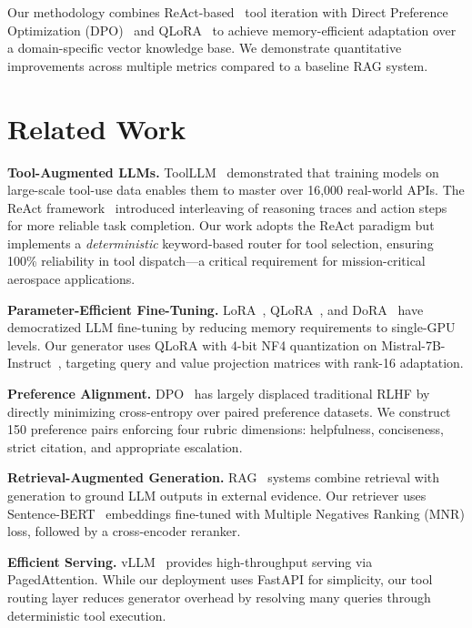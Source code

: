 \documentclass{article}
\begin{document}
Our methodology combines ReAct-based~\citep{yao2022react} tool iteration with Direct Preference Optimization (DPO)~\citep{rafailov2023direct} and QLoRA~\citep{dettmers2023qlora} to achieve memory-efficient adaptation over a domain-specific vector knowledge base. We demonstrate quantitative improvements across multiple metrics compared to a baseline RAG system.

\section{Related Work}

\textbf{Tool-Augmented LLMs.}
ToolLLM~\citep{qin2023toolllm} demonstrated that training models on large-scale tool-use data enables them to master over 16,000 real-world APIs. The ReAct framework~\citep{yao2022react} introduced interleaving of reasoning traces and action steps for more reliable task completion. Our work adopts the ReAct paradigm but implements a \textit{deterministic} keyword-based router for tool selection, ensuring 100\% reliability in tool dispatch---a critical requirement for mission-critical aerospace applications.

\textbf{Parameter-Efficient Fine-Tuning.}
LoRA~\citep{hu2021lora}, QLoRA~\citep{dettmers2023qlora}, and DoRA~\citep{liu2024dora} have democratized LLM fine-tuning by reducing memory requirements to single-GPU levels. Our generator uses QLoRA with 4-bit NF4 quantization on Mistral-7B-Instruct~\citep{jiang2023mistral}, targeting query and value projection matrices with rank-16 adaptation.

\textbf{Preference Alignment.}
DPO~\citep{rafailov2023direct} has largely displaced traditional RLHF by directly minimizing cross-entropy over paired preference datasets. We construct 150 preference pairs enforcing four rubric dimensions: helpfulness, conciseness, strict citation, and appropriate escalation.

\textbf{Retrieval-Augmented Generation.}
RAG~\citep{lewis2020rag} systems combine retrieval with generation to ground LLM outputs in external evidence. Our retriever uses Sentence-BERT~\citep{reimers2019sentencebert} embeddings fine-tuned with Multiple Negatives Ranking (MNR) loss, followed by a cross-encoder reranker.

\textbf{Efficient Serving.}
vLLM~\citep{kwon2023vllm} provides high-throughput serving via PagedAttention. While our deployment uses FastAPI for simplicity, our tool routing layer reduces generator overhead by resolving many queries through deterministic tool execution.
\end{document}

